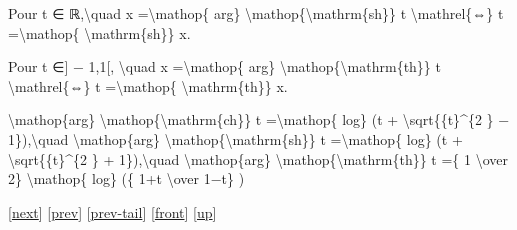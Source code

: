 \documentclass[]{article}
\begin{document}
Pour t ∈ ℝ,\textbackslash{}quad x =\textbackslash{}mathop\{ arg\}
\textbackslash{}mathop\{\textbackslash{}mathrm\{sh\}\} t
\textbackslash{}mathrel\{⇔\} t =\textbackslash{}mathop\{
\textbackslash{}mathrm\{sh\}\} x.

Pour t ∈{]} − 1,1{[}, \textbackslash{}quad x =\textbackslash{}mathop\{
arg\} \textbackslash{}mathop\{\textbackslash{}mathrm\{th\}\} t
\textbackslash{}mathrel\{⇔\} t =\textbackslash{}mathop\{
\textbackslash{}mathrm\{th\}\} x.

\textbackslash{}mathop\{arg\}
\textbackslash{}mathop\{\textbackslash{}mathrm\{ch\}\} t
=\textbackslash{}mathop\{ log\} (t + \textbackslash{}sqrt\{\{t\}\^{}\{2
\} − 1\}),\textbackslash{}quad \textbackslash{}mathop\{arg\}
\textbackslash{}mathop\{\textbackslash{}mathrm\{sh\}\} t
=\textbackslash{}mathop\{ log\} (t + \textbackslash{}sqrt\{\{t\}\^{}\{2
\} + 1\}),\textbackslash{}quad \textbackslash{}mathop\{arg\}
\textbackslash{}mathop\{\textbackslash{}mathrm\{th\}\} t =\{ 1
\textbackslash{}over 2\} \textbackslash{}mathop\{ log\} (\{ 1+t
\textbackslash{}over 1−t\} )

{[}\href{coursse49.html}{next}{]} {[}\href{coursse47.html}{prev}{]}
{[}\href{coursse47.html\#tailcoursse47.html}{prev-tail}{]}
{[}\href{coursse48.html}{front}{]}
{[}\href{coursch9.html\#coursse48.html}{up}{]}
\end{document}
